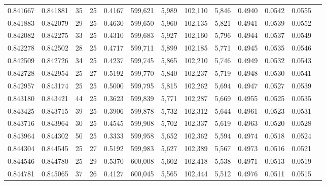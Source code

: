 \begin{tabular}{rrrrrrrrrrrrr}
0.841667 & 0.841881 &    35 &  25 &                                     0.4167 & 599,621 &   5,989 & 102,110 &   5,846 & 0.4940 & 0.0542 & 0.0555 \\
0.841883 & 0.842079 &    29 &  25 &                                     0.4630 & 599,650 &   5,960 & 102,135 &   5,821 & 0.4941 & 0.0539 & 0.0552 \\
0.842082 & 0.842275 &    33 &  25 &                                     0.4310 & 599,683 &   5,927 & 102,160 &   5,796 & 0.4944 & 0.0537 & 0.0549 \\
0.842278 & 0.842502 &    28 &  25 &                                     0.4717 & 599,711 &   5,899 & 102,185 &   5,771 & 0.4945 & 0.0535 & 0.0546 \\
0.842509 & 0.842726 &    34 &  25 &                                     0.4237 & 599,745 &   5,865 & 102,210 &   5,746 & 0.4949 & 0.0532 & 0.0543 \\
0.842728 & 0.842954 &    25 &  27 &                                     0.5192 & 599,770 &   5,840 & 102,237 &   5,719 & 0.4948 & 0.0530 & 0.0541 \\
0.842957 & 0.843174 &    25 &  25 &                                     0.5000 & 599,795 &   5,815 & 102,262 &   5,694 & 0.4947 & 0.0527 & 0.0539 \\
0.843180 & 0.843421 &    44 &  25 &                                     0.3623 & 599,839 &   5,771 & 102,287 &   5,669 & 0.4955 & 0.0525 & 0.0535 \\
0.843425 & 0.843715 &    39 &  25 &                                     0.3906 & 599,878 &   5,732 & 102,312 &   5,644 & 0.4961 & 0.0523 & 0.0531 \\
0.843716 & 0.843964 &    30 &  25 &                                     0.4545 & 599,908 &   5,702 & 102,337 &   5,619 & 0.4963 & 0.0520 & 0.0528 \\
0.843964 & 0.844302 &    50 &  25 &                                     0.3333 & 599,958 &   5,652 & 102,362 &   5,594 & 0.4974 & 0.0518 & 0.0524 \\
0.844304 & 0.844545 &    25 &  27 &                                     0.5192 & 599,983 &   5,627 & 102,389 &   5,567 & 0.4973 & 0.0516 & 0.0521 \\
0.844546 & 0.844780 &    25 &  29 &                                     0.5370 & 600,008 &   5,602 & 102,418 &   5,538 & 0.4971 & 0.0513 & 0.0519 \\
0.844781 & 0.845065 &    37 &  26 &                                     0.4127 & 600,045 &   5,565 & 102,444 &   5,512 & 0.4976 & 0.0511 & 0.0515 \\

\end{tabular}
